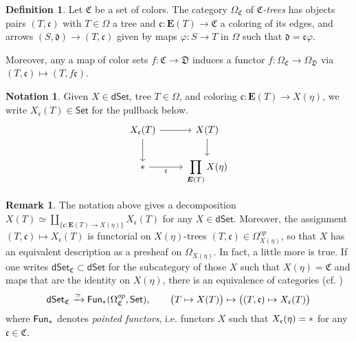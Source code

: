 \documentclass[a4paper,10pt
,draft
]{article}%
\numberwithin{equation}{section}
\numberwithin{figure}{section}
\theoremstyle{definition} %
\newtheorem{definition}[equation]{Definition}%
\newtheorem{remark}[equation]{Remark}%
\newtheorem{notation}[equation]{Notation}%
\newcommand{\Set}{\ensuremath{\mathsf{Set}}}
\newcommand{\dSet}{\mathsf{dSet}}
\newcommand{\Fun}{\mathsf{Fun}}
\newcommand{\1}{\ensuremath{\mathbbm 1}}%
\begin{document}
\begin{definition}\label{CTREE_DEF}
	Let $\mathfrak C$ be a set of colors.
	The category $\Omega_{\mathfrak C}$ of \textit{$\mathfrak C$-trees} has objects pairs $(T, \mathfrak c)$ with 
	$T \in \Omega$ a tree and
	$\mathfrak c \colon \boldsymbol{E}(T) \to \mathfrak C$ a coloring of its edges,
	and arrows
	$(S, \mathfrak d) \to (T, \mathfrak c)$
	given by maps
	$\varphi \colon S \to T$ in $\Omega$ such that $\mathfrak d = \mathfrak c \varphi$.
	
	Moreover, any a map of color sets
	$f \colon \mathfrak C \to \mathfrak D$
	induces a functor
	$f\colon \Omega_{\mathfrak{C}} \to \Omega_{\mathfrak{D}}$
	via
	$(T,\mathfrak{c}) \mapsto (T,f\mathfrak{c})$.
\end{definition}



\begin{notation}
	Given $X \in \dSet$, tree $T \in \Omega$, 
	and coloring $\mathfrak c \colon \boldsymbol{E}(T) \to X(\eta)$,
	we write $X_{\mathfrak c}(T) \in \Set$ for the pullback below.
	\begin{equation}
	\label{XUDECALT EQ}
	\begin{tikzcd}
	X_{\mathfrak c}(T) \arrow[r] \arrow[d]
	&
	X(T) \arrow[d]
	\\
	\** \arrow{r}[swap]{\mathfrak c}
	&
	\displaystyle{
		\prod\limits_{\boldsymbol{E}(T)} X(\eta)
	}
	\end{tikzcd}
	\end{equation}
\end{notation}




\begin{remark}
	The notation above gives a decomposition
	$X(T) \simeq \coprod_{\{\mathfrak c \colon \boldsymbol{E}(T) \to X(\eta)\}} X_{\mathfrak c}(T)$
	for any $X\in \dSet$.
	Moreover, the assignment
	$(T,\mathfrak c) \mapsto X_{\mathfrak{c}}(T)$ 
	is functorial on
	$X(\eta)$-trees $(T,\mathfrak c) \in \Omega^{op}_{X(\eta)}$,
	so that $X$ has an equivalent description
	as a presheaf on $\Omega_{X(\eta)}$.
	In fact, a little more is true. 
	If one writes 
	$\mathsf{dSet}_{\mathfrak{C}} \subset \dSet$
	for the subcategory of those $X$ such that
	$X(\eta) = \mathfrak{C}$ and maps that are the identity on 
	$X(\eta)$, there is an equivalence of categories ({cf. \cite[ \eqref{TAS-PREOPCOLFIXEQ EQ}]{BP_TAS}})
\begin{equation}\label{DSETCID EQ}
\dSet_{\mathfrak C} \xrightarrow{\simeq}
 \Fun_{\**}(\Omega_{\mathfrak C}^{op}, \Set),
\qquad
\big(T \mapsto X(T)\big) \mapsto \big( (T, \mathfrak c) \mapsto X_{\mathfrak c}(T) \big)
\end{equation}
where $\Fun_{\**}$ denotes \emph{pointed functors},
i.e. functors $X$ such that
$X_{\mathfrak c}(\eta) = \**$
for any $\mathfrak{c} \in \mathfrak{C}$.
\end{remark}
\end{document}
